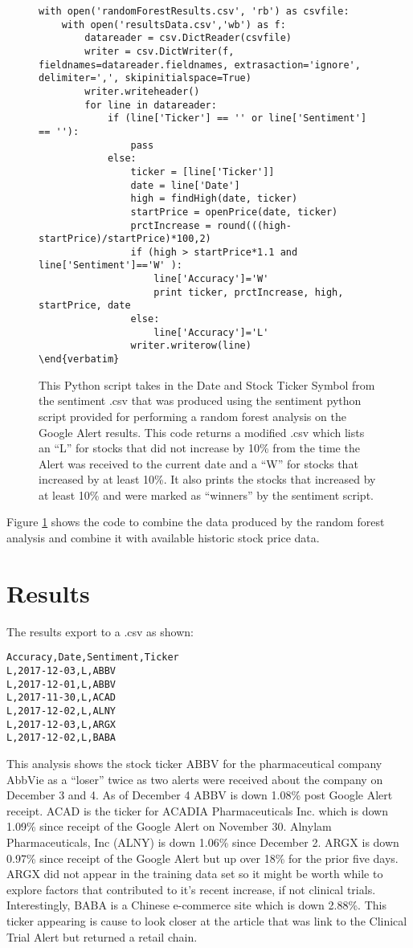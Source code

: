 \documentclass[sigconf]{acmart}
\begin{document}
\begin{figure}[htb]
\begin{lstlisting}
with open('randomForestResults.csv', 'rb') as csvfile:
	with open('resultsData.csv','wb') as f:
		datareader = csv.DictReader(csvfile)
		writer = csv.DictWriter(f, fieldnames=datareader.fieldnames, extrasaction='ignore', delimiter=',', skipinitialspace=True)
		writer.writeheader()
		for line in datareader:
			if (line['Ticker'] == '' or line['Sentiment'] == ''):
				pass
			else:
				ticker = [line['Ticker']]
				date = line['Date']
				high = findHigh(date, ticker)
				startPrice = openPrice(date, ticker)
				prctIncrease = round(((high-startPrice)/startPrice)*100,2)
				if (high > startPrice*1.1 and line['Sentiment']=='W' ):
					line['Accuracy']='W'
					print ticker, prctIncrease, high, startPrice, date
				else:
					line['Accuracy']='L'
				writer.writerow(line)
\end{verbatim}
\end{lstlisting}
\caption{This Python script takes in the Date and Stock Ticker Symbol from the sentiment .csv that was produced using the sentiment python script provided for performing a random forest analysis on the Google Alert results. This code returns a modified .csv which lists an ``L'' for stocks that did not increase by 10\% from the time the Alert was received to the current date and a ``W'' for stocks that increased by at least 10\%. It also prints the stocks that increased by at least 10\%  and were marked as ``winners'' by the sentiment script.}\label{c:result}
\end{figure}

Figure \ref{c:result} shows the code to combine the data produced by the random forest analysis and combine it with available historic stock price data.


\section{Results}
The results export to a .csv as shown:
\begin{lstlisting}
Accuracy,Date,Sentiment,Ticker
L,2017-12-03,L,ABBV
L,2017-12-01,L,ABBV
L,2017-11-30,L,ACAD
L,2017-12-02,L,ALNY
L,2017-12-03,L,ARGX
L,2017-12-02,L,BABA
\end{lstlisting}
This analysis shows the stock ticker ABBV for the pharmaceutical company AbbVie as a ``loser'' twice as two alerts were received about the company on December 3 and 4. As of December 4 ABBV is down 1.08\% post Google Alert receipt. ACAD is the ticker for ACADIA Pharmaceuticals Inc. which is down 1.09\% since receipt of the Google Alert on November 30. Alnylam Pharmaceuticals, Inc (ALNY) is down 1.06\% since December 2. ARGX is down 0.97\% since receipt of the Google Alert but up over 18\% for the prior five days. ARGX did not appear in the training data set so it might be worth while to explore factors that contributed to it's recent increase, if not clinical trials. Interestingly, BABA is a Chinese e-commerce site which is down 2.88\%. This ticker appearing is cause to look closer at the article that was link to the Clinical Trial Alert but returned a retail chain.
\end{document}
